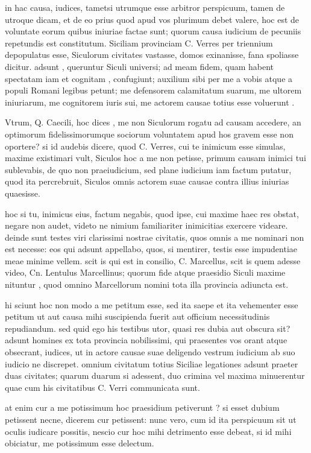  in hac causa, iudices, tametsi utrumque esse arbitror perspicuum, tamen de utroque dicam, et de eo prius quod apud vos plurimum debet valere, hoc est de voluntate eorum quibus iniuriae factae sunt; quorum causa iudicium de pecuniis repetundis est constitutum. Siciliam provinciam C. Verres per triennium depopulatus esse, Siculorum civitates vastasse, domos exinanisse, fana spoliasse dicitur. adsunt , queruntur Siculi universi; ad meam fidem, quam habent spectatam iam et cognitam , confugiunt; auxilium sibi per me a vobis atque a populi Romani legibus petunt; me defensorem calamitatum suarum, me ultorem iniuriarum, me cognitorem iuris sui, me actorem causae totius esse voluerunt .

 Vtrum, Q. Caecili, hoc dices , me non Siculorum rogatu ad causam accedere, an optimorum fidelissimorumque sociorum voluntatem apud hos gravem esse non oportere? si id audebis dicere, quod C. Verres, cui te inimicum esse simulas, maxime existimari vult, Siculos hoc a me non petisse, primum causam inimici tui sublevabis, de quo non praeiudicium, sed plane iudicium iam factum putatur, quod ita percrebruit, Siculos omnis actorem suae causae contra illius iniurias quaesisse.

 hoc si tu, inimicus eius, factum negabis, quod ipse, cui maxime haec res obstat, negare non audet, videto ne nimium familiariter inimicitias exercere videare. deinde sunt testes viri clarissimi nostrae civitatis, quos omnis a me nominari non est necesse: eos qui adsunt appellabo, quos, si mentirer, testis esse impudentiae meae minime vellem. scit is qui est in consilio, C. Marcellus, scit is quem adesse video, Cn. Lentulus Marcellinus; quorum fide atque praesidio Siculi maxime nituntur , quod omnino Marcellorum nomini tota illa provincia adiuncta est.

 hi sciunt hoc non modo a me petitum esse, sed ita saepe et ita vehementer esse petitum ut aut causa mihi suscipienda fuerit aut officium necessitudinis repudiandum. sed quid ego his testibus utor, quasi res dubia aut obscura sit? adsunt homines ex tota provincia nobilissimi, qui praesentes vos orant atque obsecrant, iudices, ut in actore causae suae deligendo vestrum iudicium ab suo iudicio ne discrepet. omnium civitatum totius Siciliae legationes adsunt praeter duas civitates; quarum duarum si adessent, duo crimina vel maxima minuerentur quae cum his civitatibus C. Verri communicata sunt.

 at enim cur a me potissimum hoc praesidium petiverunt ? si esset dubium petissent necne, dicerem cur petissent: nunc vero, cum id ita perspicuum sit ut oculis iudicare possitis, nescio cur hoc mihi detrimento esse debeat, si id mihi obiciatur, me potissimum esse delectum.

